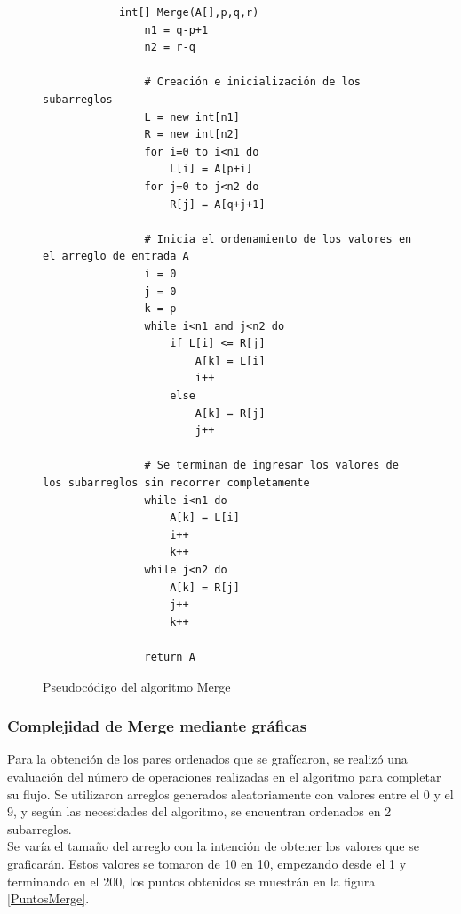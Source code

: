     \begin{figure}[h!]
        \centering
        \begin{verbatim}
            int[] Merge(A[],p,q,r)
                n1 = q-p+1
                n2 = r-q
                
                # Creación e inicialización de los subarreglos
                L = new int[n1]
                R = new int[n2]
                for i=0 to i<n1 do
                    L[i] = A[p+i]
                for j=0 to j<n2 do
                    R[j] = A[q+j+1]
                
                # Inicia el ordenamiento de los valores en el arreglo de entrada A
                i = 0
                j = 0
                k = p
                while i<n1 and j<n2 do
                    if L[i] <= R[j]
                        A[k] = L[i]
                        i++
                    else
                        A[k] = R[j]
                        j++
                        
                # Se terminan de ingresar los valores de los subarreglos sin recorrer completamente   
                while i<n1 do
                    A[k] = L[i]
                    i++
                    k++
                while j<n2 do
                    A[k] = R[j]
                    j++
                    k++
                    
                return A
        \end{verbatim}
        \caption{Pseudocódigo del algoritmo Merge}
        \label{PseudocodigoMerge}
    \end{figure}
    
    \newpage
    
\hfill \break
\hfill \break
\hfill \break
\hfill \break

    \subsubsection*{Complejidad de \textbf{Merge} mediante gráficas}
        Para la obtención de los pares ordenados que se grafícaron, se realizó una evaluación del número de operaciones realizadas en el algoritmo para completar su flujo. Se utilizaron arreglos generados aleatoriamente con valores entre el 0 y el 9, y según las necesidades del algoritmo, se encuentran ordenados en 2 subarreglos. \\
        
        Se varía el tamaño del arreglo con la intención de obtener los valores que se graficarán. Estos valores se tomaron de 10 en 10, empezando desde el 1 y terminando en el 200, los puntos obtenidos se muestrán en la figura \ref{PuntosMerge}.\\
        

